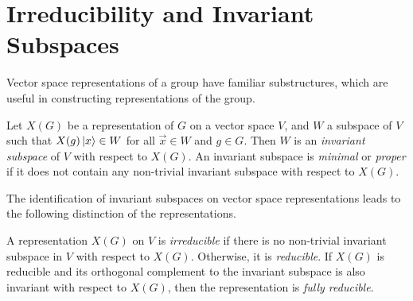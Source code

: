 \section{Irreducibility and Invariant Subspaces}

Vector space representations of a group have familiar substructures, which are useful in constructing representations of the group.
\begin{definition}
    Let $X(G)$ be a representation of $G$ on a vector space $V$, and $W$ a subspace of $V$ such that $X(g)\ket{x}\in W$ for all $\vec{x}\in W$ and $g\in G$. Then $W$ is an \textit{invariant subspace} of $V$ with respect to $X(G)$. An invariant subspace is \textit{minimal} or \textit{proper} if it does not contain any non-trivial invariant subspace with respect to $X(G)$.
\end{definition}

The identification of invariant subspaces on vector space representations leads to the following distinction of the representations.
\begin{definition}
    A representation $X(G)$ on $V$ is \textit{irreducible} if there is no non-trivial invariant subspace in $V$ with respect to $X(G)$. Otherwise, it is \textit{reducible}. If $X(G)$ is reducible and its orthogonal complement to the invariant subspace is also invariant with respect to $X(G)$, then the representation is \textit{fully reducible}.
\end{definition}

